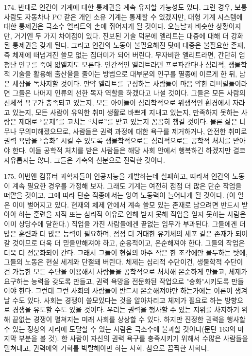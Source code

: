 \documentclass[11pt,a4paper]{article}
\begin{document}
\begin{multicols}{2}
174. 반대로 인간이 기계에 대한 통제권을 계속 유지할 가능성도 있다. 그런 경우, 보통 사람도 자동차나  PC 같은 개인 소유 기계는 통제할 수 있겠지만, 대형 기계 시스템에 대한 통제권은 극소수 엘리트의 손에  쥐어지게 될 것이다. 오늘날과 비슷한 상황이지만, 거기엔 두 가지 차이점이 있다. 진보된 기술 덕분에  엘리트는 대중에 대해 더 강화된 통제권을 갖게 된다. 그리고 인간의 노동이 불필요해진 탓에 대중은  불필요한 존재, 즉 체제에 떠넘겨진 쓸모 없는 짐더미가 되어 버린다. 무자비한 엘리트라면, 간단히  엄청난 인구를 죽여 없앨지도 모른다. 인간적인 엘리트라면 프로파간다나 심리적, 생물학적 기술을  활용해 출산율을 줄이는 방법으로 대부분의 인구를 멸종에 이르게 한 뒤, 남은 세상을 독차지할 것이다.  만약 엘리트를 구성하는 사람들이 마음 약한 리버럴들이라면 그들은 나머지 인류의 선한 목자 역할을  하겠다고 나설 것이다. 그들은 모든 사람의 신체적 욕구가 충족되고 있는지, 모든 아이들이 심리학적으로  위생적인 환경에서 자라고 있는지, 모든 사람이 유익한 취미 생활로 바쁘게 지내고 있는지, 만족하지  못하는 사람은 제대로 “문제”를 고치는 “치료”를 받고 있는지 꼼꼼히 챙길 것이다. 물론 삶은 너무나  무의미해졌으므로, 사람들은 권력 과정에 대한 욕구를 제거하거나, 안전한 취미로 권력 욕망을 “승화” 시킬 수 있도록 생물학적으로든 심리적으로든 공학적 처치를 받아야 한다. 이들 공학적 처치를 받은  사람들은 해당 사회 안에서 행복하긴 하겠지만 결코 자유롭지는 않다. 그들은 가축의 신분으로 전락한  것이다.  


175. 이번엔 컴퓨터 과학자들이 인공지능을 개발하는데 실패하고, 따라서 인간의 노동이 계속 필요한  경우를 가정해 보자. 그래도 기계는 여전히 점점 더 많은 단순 작업을 떠맡을 것이고, 그에 따라 단순 직종에서는 잉여 노동력이 늘어나게 될 것이다. (이 일은 이미 벌어지고 있다. 현재의 체제 안에서 계속  쓸모 있는 존재로 남으려면 반드시 받아야 하는 훈련을 지적 또는 심리적 이유로 인해 받지 못해 직업을  얻지 못하는 사람은 이미 상당수에 달한다.) 직업을 가진 사람들에겐 끝없는 임무가 부과된다. 그들에겐
더 많은 훈련과 더 많은 능력이 필요하며, 점점 더 거대한 유기체의 세포 같은 존재가 되어 갈 것이므로  더욱 더 믿을만해져야 하고, 순응적이고, 온순해져야 한다. 그들의 작업은 더욱 더 전문화되어 간다.  그래서 그들이 현실의 아주 작은 한 조각에만 몰두하는 탓에, 그들의 노동은 현실 세계와 단절돼 버린다.  체제는 심리적 수단이건, 생물학적 수단이건 가능한 모든 수단을 이용해서 사람들을 공학적으로 처치해 온순하게 만들고, 체제가 요구하는 능력을 갖도록 만들고, 권력 욕망을 전문화된 작업으로 "승화"시키도록 만들어야 한다. 그런데 그런 사회의 사람들이 반드시 온순해져야만 하는가에는 이론이 생겨날 수도 있다. 사회는 경쟁이 쓸모있다는 것을 알아차리고 체제가 필요로 하는 방향으로 경쟁을 유도할 수도 있을 것이다. 우리는 권력을 행사할 수 있는 지위를 차지하기 위해 끝없는 경쟁이 펼쳐지는 미래 사회를 상상할 수 있다. 하지만 진정한 권력을 행사할 수 있는 정상의 자리에 도달할 수 있는 사람은 극소수에 불과할  것이다(문단 163의 마지막 부분을 볼 것). 한 사람이 자신의 권력 욕구를 충족시키기 위해서 수많은  사람들을 밀쳐내고, 권력에의 기회를 박탈해야만 하는 사회. 참으로 끔찍한 사회다.  



\end{multicols}
\end{document}
